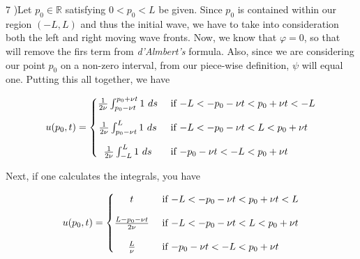 \documentclass[executivepaper]{article}
\begin{document}
\begin{flushleft}

7 )Let $p_{0} \in \mathbb R$ satisfying $0 < p_{0} < L$ be given. Since $p_{0}$ is contained within our region $(-L,L)$ and thus the initial wave, we have to take into consideration both the left and right moving wave fronts. Now, we know that $\varphi=0$, so that will remove the firs term from \textit{d'Almbert's} formula. Also, since we are considering our point $p_{0}$ on a non-zero interval, from our piece-wise definition, $\psi$ will equal one. Putting this all together, we have

\begin{center}

\[
 u(p_{0},t)=
  \begin{cases}
      \hfill \frac{1}{2\nu} \int_{p_{0}-\nu t}^{p_{0}+\nu t} 1 \ ds  \hfill & \text{ if $-L < -p_{0}-\nu t < p_{0}+\nu t < -L$} \\[1em]
      
      \hfill \frac{1}{2\nu} \int_{p_{0}-\nu t}^{L} 1 \ ds \hfill & \text{ if $-L < -p_{0}-\nu t < L < p_{0}+\nu t$} \\[1em]
      
      \hfill \frac{1}{2\nu} \int_{-L}^{L} 1 \ ds \hfill & \text{ if $-p_{0}-\nu t < -L < p_{0}+\nu t$}
  \end{cases}
\]

\end{center}

Next, if one calculates the integrals, you have

\begin{center}

\[
 u(p_{0},t)=
  \begin{cases}
      \hfill t  \hfill & \text{ if $-L < -p_{0}-\nu t < p_{0}+\nu t < L$} \\[1em]
      
      \hfill \frac{L-p_{0}-\nu t}{2\nu} \hfill & \text{ if $-L < -p_{0}-\nu t < L < p_{0}+\nu t$} \\[1em]
      
      \hfill \frac{L}{\nu} \hfill & \text{ if $-p_{0}-\nu t < -L < p_{0}+\nu t$}
  \end{cases}
\]

\end{center}

\end{flushleft}

\pagebreak

\vspace*{-40mm}
\end{document}
